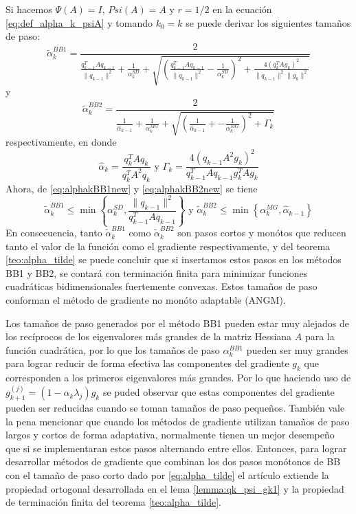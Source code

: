 Si hacemos $\Psi(A)= I$, $Psi(A)= A$ y $r=1/2$ en la ecuación \ref{eq:def_alpha_k_psiA} y tomando $k_0=k$ se puede derivar los siguientes tamaños de paso:
\begin{equation}
	\tilde{\alpha}_k^{BB1} = \frac{2}{\frac{q_{k-1}^TAq_{k-1}}{\|q_{k-1}\|^2} + \frac{1}{\alpha_k^{SD}}+\sqrt{ \left(\frac{q_{k-1}^TAq_{k-1}}{\|q_{k-1}\|^2} -\frac{1}{\alpha_{k}^{SD}} \right)^2 + \frac{4\left(q_k^TAg_k\right)^2}{\|q_{k-1}\|^2\|g_k\|^2} }}
	\label{eq:alphakBB1new}
\end{equation} 
y 
\begin{equation}
	\tilde{\alpha}_k^{BB2} = \frac{2}{\frac{1}{\hat{\alpha}_{k-1}} +\frac{1}{\alpha_k^{MG}} + \sqrt{\left( \frac{1}{\hat{\alpha}_{k-1}}+ - \frac{1}{\alpha_k^{MG}}  \right) ^2 + \Gamma_k} }
	\label{eq:alphakBB2new}
\end{equation}
respectivamente, en donde 
\begin{equation}
	\hat{\alpha}_k = \frac{q_k^TAq_k}{q_k^TA^2q_k} \text{ \ y \ } \Gamma_k = \frac{4\left(q_{k-1}A^2g_k\right)^2}{q_{k-1}^TAq_{k-1}g_k^TAg_k}
\end{equation}
Ahora, de \ref{eq:alphakBB1new} y \ref{eq:alphakBB2new} se tiene 
\begin{equation}
	\tilde{\alpha}_k^{BB1}\leq\min{\left\{\alpha_k^{SD}, \frac{\|q_{k-1}\|^2}{q_{k-1}^{T}Aq_{k-1}}\right\}} \text{ \ y \ } \tilde{\alpha}_k^{BB2}\leq \min{\left\{\alpha_k^{MG}, \hat{\alpha}_{k-1}\right\}} \label{eq:alphabounds}
\end{equation}
En consecuencia, tanto $\tilde{\alpha}_k^{BB1}$ como $\tilde{\alpha}_k^{BB2}$ son pasos cortos y monótos que reducen tanto el valor de la función como el gradiente respectivamente, y del teorema \ref{teo:alpha_tilde} se puede concluir que si insertamos estos pasos en los métodos BB1 y BB2, se contará con terminación finita para minimizar funciones cuadráticas bidimensionales fuertemente convexas. Estos tamaños de paso conforman el método de gradiente no monóto adaptable (ANGM).
\par Los tamaños de paso generados por el método BB1 pueden estar muy alejados de los recíprocos de los eigenvalores más grandes de la matriz Hessiana $A$ para la función cuadrática, por lo que los tamaños de paso $\alpha_k^{BB1}$ pueden ser muy grandes para lograr reducir de forma efectiva las componentes  del gradiente $g_k$ que corresponden a los primeros eigenvalores más grandes. Por lo que haciendo uso de $g_{k+1}^{(j)} = (1-\alpha_k\lambda_j)g_k$ se puded observar que estas componentes del gradiente pueden ser reducidas cuando se toman tamaños de paso pequeños. También vale la pena mencionar que cuando los métodos de gradiente utilizan tamaños de paso largos y cortos de forma adaptativa, normalmente tienen un mejor desempeño que si se implementaran estos pasos alternando entre ellos. Entonces, para lograr desarrollar métodos de gradiente que combinan los dos pasos monótonos de BB con el tamaño de paso corto dado por \ref{eq:alpha_tilde} el artículo extiende la propiedad ortogonal desarrollada en el lema \ref{lemma:qk_psi_gk1} y la propiedad de terminación finita del teorema \ref{teo:alpha_tilde}.

